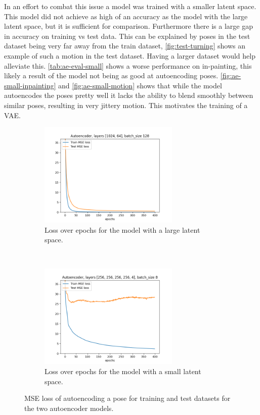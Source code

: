 In an effort to combat this issue a model was trained with a smaller latent space. This model did not achieve as high of an accuracy as the model with the large latent space, but it is sufficient for comparison. Furthermore there is a large gap in accuracy on training vs test data. This can be explained by poses in the test dataset being very far away from the train dataset, \autoref{fig:test-turning} shows an example of such a motion in the test dataset. Having a larger dataset would help alleviate this. \autoref{tab:ae-eval-small} shows a worse performance on in-painting, this likely a result of the model not being as good at autoencoding poses. \autoref{fig:ae-small-inpainting} and \autoref{fig:ae-small-motion} shows that while the model autoencodes the poses pretty well it lacks the ability to blend smoothly between similar poses, resulting in very jittery motion. This motivates the training of a VAE.





\begin{figure}[h]
    \centering
    \begin{subfigure}[t]{0.5\textwidth}
        \centering
        \includegraphics[height=5cm]{img/simple_1024-64_batch-128_losses}
        \caption{Loss over epochs for the model with a large latent space.}
    \label{fig:ae-loss-large}
    \end{subfigure}%
    ~
    \begin{subfigure}[t]{0.5\textwidth}
        \centering
        \includegraphics[height=5cm]{img/simple_256-256-256-256-4_batch-8_losses}
        \caption{Loss over epochs for the model with a small latent space.}
    \label{fig:ae-loss-small}
    \end{subfigure}
    \caption{MSE loss of autoencoding a pose for training and test datasets for the two autoencoder models.}
\end{figure}



